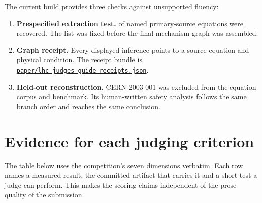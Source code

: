 \documentclass[10pt]{article}
\newcommand{\sourcefile}[2]{\href{https://github.com/synthetix-institute/lhc-mechanism-audit/blob/main/#1}{\texttt{#2}}}
\begin{document}
The current build provides three checks against unsupported fluency:
\begin{enumerate}
\item \textbf{Prespecified extraction test.} \BenchmarkRecovered{} of \BenchmarkTotal{} named primary-source equations were recovered. The list was fixed before the final mechanism graph was assembled.
\item \textbf{Graph receipt.} Every displayed inference points to a source equation and physical condition. The receipt bundle is \sourcefile{paper/lhc_judges_guide_receipts.json}{paper/lhc\_judges\_guide\_receipts.json}.
\item \textbf{Held-out reconstruction.} CERN-2003-001 was excluded from the equation corpus and benchmark. Its human-written safety analysis follows the same branch order and reaches the same conclusion.
\end{enumerate}

\section{Evidence for each judging criterion}

The table below uses the competition's seven dimensions verbatim. Each row names a measured result, the committed artifact that carries it and a short test a judge can perform. This makes the scoring claims independent of the prose quality of the submission.
\end{document}
